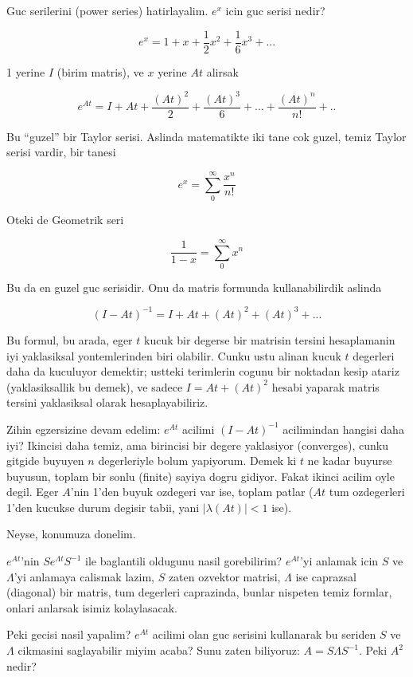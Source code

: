 \documentclass[12pt,fleqn]{article}\usepackage{../common}
\begin{document}
Guc serilerini (power series) hatirlayalim. $e^{x}$ icin guc serisi nedir? 

\[ e^x = 1 + x + \frac{1}{2}x^2 + \frac{1}{6}x^3 + ... \]

1 yerine $I$ (birim matris), ve $x$ yerine $At$ alirsak

\[ e^{At} = I + At + \frac{(At)^2}{2} + \frac{(At)^3}{6} + ... +
 \frac{(At)^n}{n!} + ..
\]

Bu ``guzel'' bir Taylor serisi. Aslinda matematikte iki tane cok guzel,
temiz Taylor serisi vardir, bir tanesi

\[ e^x = \sum_0^{\infty} \frac{x^n}{n!} \]

Oteki de Geometrik seri

\[ \frac{1}{1-x} = \sum_0^{\infty} x^n\]

Bu da en guzel guc serisidir. Onu da matris formunda kullanabilirdik aslinda

\[ (I-At)^{-1} = I + At + (At)^2 + (At)^3 + ... \]

Bu formul, bu arada, eger $t$ kucuk bir degerse bir matrisin tersini
hesaplamanin iyi yaklasiksal yontemlerinden biri olabilir. Cunku ustu
alinan kucuk $t$ degerleri daha da kuculuyor demektir; ustteki terimlerin
cogunu bir noktadan kesip atariz (yaklasiksallik bu demek), ve sadece 
$I =
At + (At)^2$ hesabi yaparak matris tersini yaklasiksal olarak
hesaplayabiliriz.

Zihin egzersizine devam edelim: $e^{At}$ acilimi $(I-At)^{-1}$ acilimindan
hangisi daha iyi? Ikincisi daha temiz, ama birincisi bir degere yaklasiyor
(converges), cunku gitgide buyuyen $n$ degerleriyle bolum yapiyorum. Demek
ki $t$ ne kadar buyurse buyusun, toplam bir sonlu (finite) sayiya dogru
gidiyor. Fakat ikinci acilim oyle degil. Eger $A$'nin 1'den buyuk ozdegeri
var ise, toplam patlar ($At$ tum ozdegerleri 1'den kucukse durum degisir
tabii, yani $|\lambda(At)| < 1$ ise).

Neyse, konumuza donelim. 

$e^{At}$'nin $Se^{\Lambda t}S^{-1}$ ile baglantili oldugunu nasil
gorebilirim? $e^{At}$'yi anlamak icin $S$ ve $\Lambda$'yi anlamaya calismak
lazim, $S$ zaten ozvektor matrisi, $\Lambda$ ise caprazsal (diagonal) bir
matris, tum degerleri caprazinda, bunlar nispeten temiz formlar, onlari
anlarsak isimiz kolaylasacak.

Peki gecisi nasil yapalim? $e^{At}$ acilimi olan guc serisini kullanarak bu
seriden $S$ ve $\Lambda$ cikmasini saglayabilir miyim acaba? Sunu zaten
biliyoruz: $A = S \Lambda S^{-1}$. Peki $A^2$ nedir?
\end{document}
